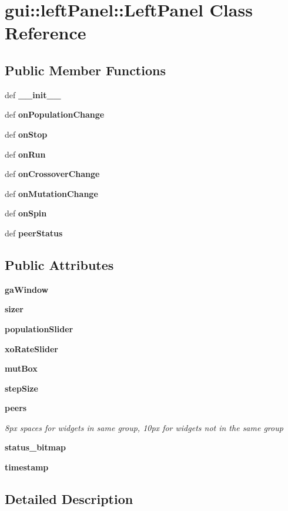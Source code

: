 \section{gui::leftPanel::LeftPanel Class Reference}
\label{classgui_1_1leftPanel_1_1LeftPanel}
\subsection*{Public Member Functions}
\begin{CompactItemize}
\item 
def {\bf \_\-\_\-init\_\-\_\-}
\item 
def {\bf onPopulationChange}
\item 
def {\bf onStop}
\item 
def {\bf onRun}
\item 
def {\bf onCrossoverChange}
\item 
def {\bf onMutationChange}
\item 
def {\bf onSpin}
\item 
def {\bf peerStatus}
\end{CompactItemize}
\subsection*{Public Attributes}
\begin{CompactItemize}
\item 
{\bf gaWindow}
\item 
{\bf sizer}
\item 
{\bf populationSlider}
\item 
{\bf xoRateSlider}
\item 
{\bf mutBox}
\item 
{\bf stepSize}
\item 
{\bf peers}
\begin{CompactList}\small\item\em 8px spaces for widgets in same group, 10px for widgets not in the same group \item\end{CompactList}\item 
{\bf status\_\-bitmap}
\item 
{\bf timestamp}
\end{CompactItemize}


\subsection{Detailed Description}



